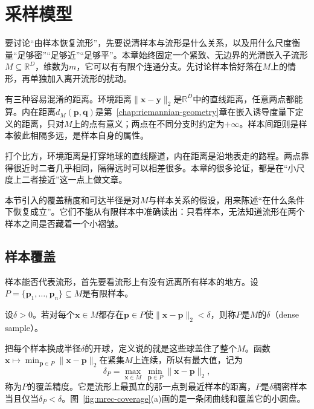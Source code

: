 \section{采样模型}
\label{sec:mrec-sampling}

要讨论“由样本恢复流形”，先要说清样本与流形是什么关系，以及用什么尺度衡量“足够密”“足够近”“足够平”。本章始终固定一个紧致、无边界的光滑嵌入子流形$M\subseteq\mathbb R^D$，维数为$m$，它可以有有限个连通分支。先讨论样本恰好落在$M$上的情形，再单独加入离开流形的扰动。

有三种容易混淆的距离。环境距离$\lVert\bm x-\bm y\rVert_2$是$\mathbb R^D$中的直线距离，任意两点都能算。内在距离$d_M(\bm p,\bm q)$是第~\ref{chap:riemannian-geometry}章在嵌入诱导度量下定义的距离，只对$M$上的点有意义；两点在不同分支时约定为$+\infty$。样本间距则是样本彼此相隔多远，是样本自身的属性。

打个比方，环境距离是打穿地球的直线隧道，内在距离是沿地表走的路程。两点靠得很近时二者几乎相同，隔得远时可以相差很多。本章的很多论证，都是在“小尺度上二者接近”这一点上做文章。

本节引入的覆盖精度和可达半径是对$M$与样本关系的假设，用来陈述“在什么条件下恢复成立”。它们不能从有限样本中准确读出：只看样本，无法知道流形在两个样本之间是否藏着一个小褶皱。

\subsection{样本覆盖}
\label{sec:mrec-coverage}

样本能否代表流形，首先要看流形上有没有远离所有样本的地方。设$P=\{\bm p_1,\ldots,\bm p_n\}\subseteq M$是有限样本。

\begin{definition}[稠密样本]
\label{def:mrec-dense-sample}
设$\delta>0$。若对每个$\bm x\in M$都存在$\bm p\in P$使$\lVert\bm x-\bm p\rVert_2<\delta$，则称$P$是$M$的$\delta$（dense sample）。
\end{definition}

把每个样本换成半径$\delta$的开球，定义说的就是这些球盖住了整个$M$。函数$\bm x\mapsto\min_{\bm p\in P}\lVert\bm x-\bm p\rVert_2$在紧集$M$上连续，所以有最大值，记为
\begin{equation}
 \delta_P=\max_{\bm x\in M}\ \min_{\bm p\in P}\lVert\bm x-\bm p\rVert_2 ,
 \label{eq:mrec-covering-radius}
\end{equation}
称为$P$的覆盖精度。它是流形上最孤立的那一点到最近样本的距离，$P$是$\delta$稠密样本当且仅当$\delta_P<\delta$。图~\ref{fig:mrec-coverage}(a)画的是一条闭曲线和覆盖它的小圆盘。

